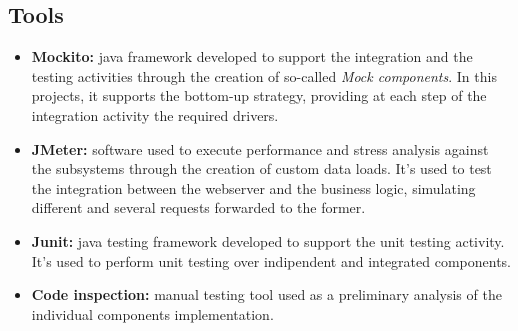 \subsection{Tools}

\begin{itemize}
	\item \textbf{Mockito:} java framework developed to support the integration and the testing activities through the creation of so-called \textit{Mock components}. In this projects, it supports the bottom-up strategy, providing at each step of the integration activity the required drivers.

	\item \textbf{JMeter:} software used to execute performance and stress analysis against the subsystems through the creation of custom data loads.
It's used to test the integration between the webserver and the business logic, simulating different and several requests forwarded to the former.

	\item \textbf{Junit:} java testing framework developed to support the unit testing activity. It's used to perform unit testing over indipendent and integrated components. 

	\item \textbf{Code inspection:} manual testing tool used as a preliminary analysis of the individual components implementation.
\end{itemize}
